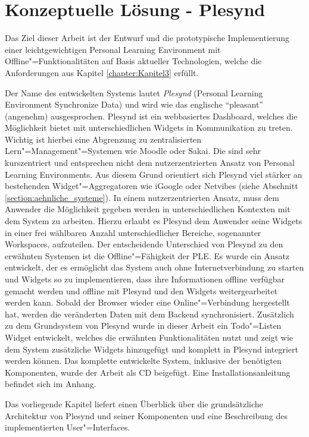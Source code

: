 \chapter{Konzeptuelle Lösung - Plesynd} 
\label{chapter:Kapitel5}
Das Ziel dieser Arbeit ist der Entwurf und die prototypische Implementierung einer leichtgewichtigen Personal Learning Environment mit Offline"=Funktionalitäten auf Basis aktueller Technologien, welche die Anforderungen aus Kapitel \ref{chapter:Kapitel3} erfüllt. 

Der Name des entwickelten Systems lautet \emph{Plesynd} (Personal Learning Environment Synchronize Data) und wird wie das englische "`pleasant"' (angenehm) ausgesprochen. Plesynd ist ein webbasiertes Dashboard, welches die Möglichkeit bietet mit unterschiedlichen Widgets in Kommunikation zu treten. Wichtig ist hierbei eine Abgrenzung zu zentralisierten Lern"=Management"=Systemen wie Moodle oder Sakai. Die sind sehr kurszentriert und entsprechen nicht dem nutzerzentrierten Ansatz von Personal Learning Environments. Aus diesem Grund orientiert sich Plesynd viel stärker an bestehenden Widget"=Aggregatoren wie iGoogle oder Netvibes (siehe Abschnitt \ref{section:aehnliche_systeme}). In einem nutzerzentrierten Ansatz, muss dem Anwender die Möglichkeit gegeben werden in unterschiedlichen Kontexten mit dem System zu arbeiten. Hierzu erlaubt es Plesynd dem Anwender seine Widgets in einer frei wählbaren Anzahl unterschiedlicher Bereiche, sogenannter Workspaces, aufzuteilen. Der entscheidende Unterschied von Plesynd zu den erwähnten Systemen ist die Offline"=Fähigkeit der PLE. Es wurde ein Ansatz entwickelt, der es ermöglicht das System auch ohne Internetverbindung zu starten und Widgets so zu implementieren, dass ihre Informationen offline verfügbar gemacht werden und offline mit Plesynd und den Widgets weitergearbeitet werden kann. Sobald der Browser wieder eine Online"=Verbindung hergestellt hat, werden die veränderten Daten mit dem Backend synchronisiert. Zusätzlich zu dem Grundsystem von Plesynd wurde in dieser Arbeit ein Todo"=Listen Widget entwickelt, welches die erwähnten Funktionalitäten nutzt und zeigt wie dem System zusätzliche Widgets hinzugefügt und komplett in Plesynd integriert werden können. Das komplette entwickelte System, inklusive der benötigten Komponenten, wurde der Arbeit als CD beigefügt. Eine Installationsanleitung befindet sich im Anhang.

Das vorliegende Kapitel liefert einen Überblick über die grundsätzliche Architektur von Plesynd und seiner Komponenten und eine Beschreibung des implementierten User"=Interfaces.

